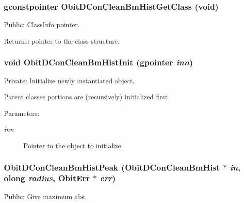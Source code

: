 \subsubsection{\setlength{\rightskip}{0pt plus 5cm}gconstpointer Obit\-DCon\-Clean\-Bm\-Hist\-Get\-Class (void)}\label{ObitDConCleanBmHist_8c_a7}


Public: Class\-Info pointer. 

\begin{Desc}
\item[Returns:]pointer to the class structure. \end{Desc}
\subsubsection{\setlength{\rightskip}{0pt plus 5cm}void Obit\-DCon\-Clean\-Bm\-Hist\-Init (gpointer {\em inn})}\label{ObitDConCleanBmHist_8c_a3}


Private: Initialize newly instantiated object. 

Parent classes portions are (recursively) initialized first \begin{Desc}
\item[Parameters:]
\begin{description}
\item[{\em inn}]Pointer to the object to initialize. \end{description}
\end{Desc}
\subsubsection{ Obit\-DCon\-Clean\-Bm\-Hist\-Peak ({\bf Obit\-DCon\-Clean\-Bm\-Hist} $\ast$ {\em in}, {\bf olong} {\em radius}, {\bf Obit\-Err} $\ast$ {\em err})}\label{ObitDConCleanBmHist_8c_a12}


Public: Give maximum abs. 

